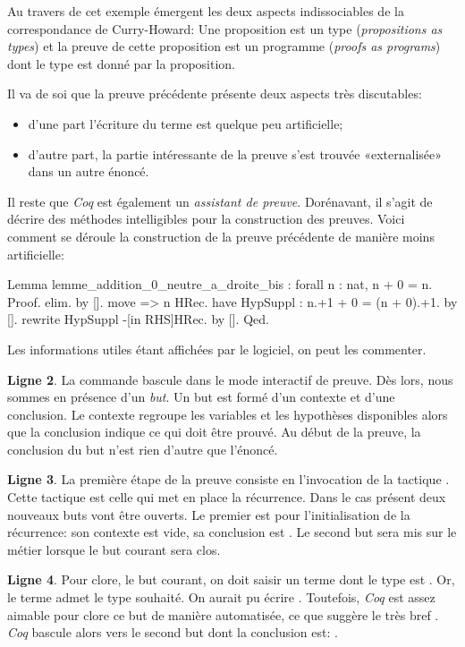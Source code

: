 \documentclass[a4paper,10pt]{article}
\begin{document}
Au travers de cet exemple émergent les deux aspects indissociables de la correspondance de Curry-Howard:
Une proposition est un type (\emph{propositions as types}) et la preuve de cette proposition est un programme
(\emph{proofs as programs}) dont le type est donné par la proposition.

Il va de soi que la preuve précédente présente deux aspects très discutables:
\begin{itemize}
\item d'une part l'écriture du terme  est quelque peu artificielle;
\item d'autre part, la partie intéressante de la preuve s'est trouvée «externalisée» dans un autre énoncé.
\end{itemize}

Il reste que \emph{Coq} est également un \emph{assistant de preuve}.  Dorénavant, il s'agit de décrire des méthodes
intelligibles pour la construction des preuves.  Voici comment se déroule la construction de la preuve
précédente de manière moins artificielle:

\begin{coq}[]
Lemma lemme_addition_0_neutre_a_droite_bis : forall n : nat, n + 0 = n.
Proof.
  elim.
  by [].
  move => n HRec.
  have HypSuppl : n.+1 + 0 = (n + 0).+1.
    by [].
  rewrite HypSuppl -[in RHS]HRec.
  by [].
Qed.
\end{coq}

Les informations utiles étant affichées par le logiciel, on peut les commenter.

\textbf{Ligne 2}.  La commande  bascule dans le mode interactif de preuve.  Dès lors, nous sommes en
présence d'un \emph{but}.  Un but est formé d'un contexte et d'une conclusion.  Le contexte regroupe les
variables et les hypothèses disponibles alors que la conclusion indique ce qui doit être prouvé.  Au début
de la preuve, la conclusion du but n'est rien d'autre que l'énoncé.

\textbf{Ligne 3}.  La première étape de la preuve consiste en l'invocation de la tactique .  Cette tactique
est celle qui met en place la récurrence.  Dans le cas présent deux nouveaux buts vont être ouverts.  Le
premier est pour l'initialisation de la récurrence: son contexte est vide, sa conclusion est .
Le second but sera mis sur le métier lorsque le but courant sera clos.

\textbf{Ligne 4}.  Pour clore, le but courant, on doit saisir un terme dont le type est .  Or, le
terme  admet le type souhaité.  On aurait pu écrire .  Toutefois, \emph{Coq} est
assez aimable pour clore ce but de manière automatisée, ce que suggère le très bref .  \emph{Coq}
bascule alors vers le second but dont la conclusion est: .
\end{document}
